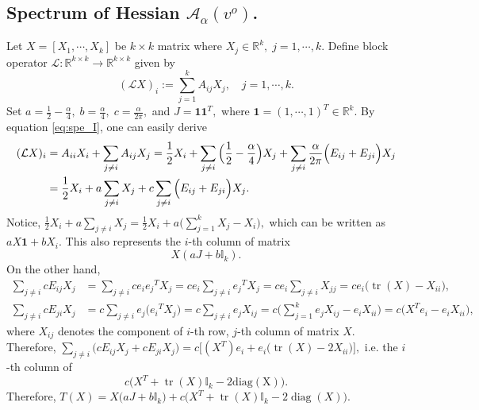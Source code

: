 \documentclass{amsart}%
\begin{document}
\subsection{Spectrum of Hessian \texorpdfstring{$\mathcal A_{\alpha}(v^o)$}{A(vo)}.}\label{ap:spectrum} Let $X=[X_1,\cdots, X_k]$ be $k\times k$ matrix where $X_j\in \mathbb R^k,\; j=1,\cdots,k.$ Define block operator $\mathcal L:\mathbb R^{k\times k}\to \mathbb R^{k\times k}$ given by
\[
(\mathcal LX)_i:=\sum_{j=1}^k A_{ij}X_j,\quad j=1,\cdots,k.
\]
Set $a=\frac{1}{2}-\frac{\alpha}{4},\; b=\frac{\alpha}{4},\;c=\frac{\alpha}{2\pi},$ and $J=\mathbf{1}\mathbf{1}^T,$  where $\mathbf{1}=(1,\cdots,1)^T\in\mathbb R^k.$ By equation \eqref{eq:spe_I}, one can easily derive
\begin{align}\label{eq:spectrum_com}
(\mathcal LX)_i&=A_{ii}X_i+\sum_{j\neq i}A_{ij}X_j=\frac{1}{2}X_i+\sum_{j\neq i}\Big(\frac{1}{2}-\frac{\alpha}{4}\Big)X_j+\sum_{j\neq i}\frac{\alpha}{2\pi}\Big(E_{ij}+E_{ji}\Big)X_j\notag\\
    &=\frac{1}{2}X_i+a\sum_{j\neq i}X_j+c\sum_{j\neq i}\Big(E_{ij}+E_{ji}\Big)X_j.
\end{align}
Notice, $\frac{1}{2}X_i+a\sum_{j\neq i}X_j=\frac{1}{2}X_i+a\Big(\sum_{j=1}^kX_j-X_i\Big),$ which can be written as $aX\mathbf{1}+bX_i.$ This also represents the $i$-th column of matrix
\[
X(aJ+b\mathbb I_k).
\]
On the other hand,
\begin{align*}
    \sum_{j\neq i}cE_{ij}X_j&=\sum_{j\neq i}ce_i {e_j}^T X_j=ce_i\sum_{j\neq i}{e_j}^TX_j=ce_i\sum_{j\neq i}X_{jj}=ce_i\Big(\operatorname{tr}(X)-X_{ii}\Big),\\
\sum_{j\neq i}cE_{ji}X_j&=c\sum_{j\neq i}e_j \Big({e_i}^T X_j\Big)=c\sum_{j\neq i}e_jX_{ij}=c\Big(\sum_{j=1}^k e_jX_{ij}-e_iX_{ii}\Big)=c\Big(X^Te_i-e_iX_{ii}\Big),    
\end{align*}
where $X_{ij}$ denotes the component of $i$-th row, $j$-th column of matrix $X.$ Therefore, $\sum_{j\neq i}\Big(cE_{ij}X_j+cE_{ji}X_j\Big)=c\Big[(X^T)e_i+e_i\Big(\operatorname{tr}(X)-2X_{ii}\Big)\Big],$ i.e. the $i$-th column of 
\[
c\Big(X^T+\operatorname{tr}(X)\mathbb I_k-2\operatorname{diag(X)}\Big).
\]
Therefore, $    T(X)=X\Big(aJ+b\mathbb I_k\Big)+c\Big(X^T+\operatorname{tr}(X)\mathbb I_k-2\operatorname{diag}(X)\Big).$
\end{document}

